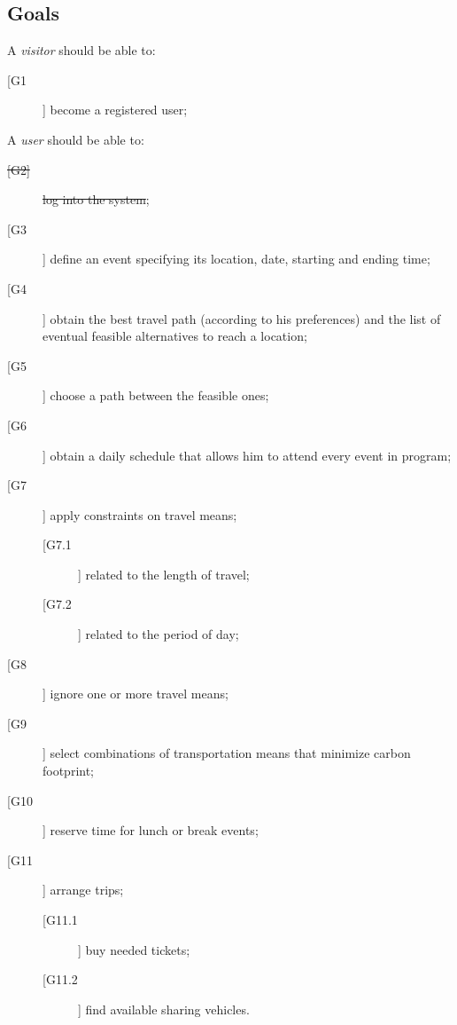 \subsection{Goals}
A \textit{visitor} should be able to:
\begin{description}
\item [[G1]] become a registered user;
\end{description}

\noindent A \textit{user} should be able to:
\begin{description}
\item[\sout{[G2]}] \sout{log into the system};
\item[[G3]] define an event specifying its location, date, starting and ending time;
\item[[G4]] obtain the best travel path (according to his preferences) and the list of eventual feasible alternatives to reach a location;
\item[[G5]] choose a path between the feasible ones; 
\item[[G6]] obtain a daily schedule that allows him to attend every event in program;
\newline
\item[[G7]] apply constraints on travel means;
	\begin{description}
	\item[[G7.1]] related to the length of travel;
	\item[[G7.2]] related to the period of day;
	\end{description}
\item[[G8]] ignore one or more travel means;
\item[[G9]] select combinations of transportation means that minimize carbon footprint;
\item[[G10]] reserve time for lunch or break events;
\item[[G11]] arrange trips;
	\begin{description}
	\item[[G11.1]] buy needed tickets;
	\item[[G11.2]] find available sharing vehicles.
	\end{description}
\end{description}
